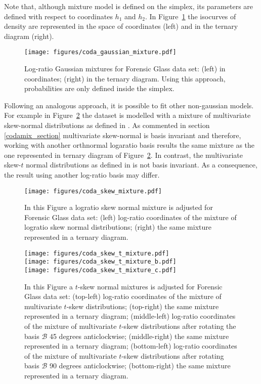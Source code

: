 \documentclass[12pt, a4paper]{article}
\begin{document}
Note that, although mixture model is defined on the simplex, its parameters are defined with respect to coordinates $h_1$ and $h_2$. In Figure~\ref{fig07fittingcodaGaussian} the isocurves of density are represented in the space
of coordinates (left) and in the ternary diagram (right).

\begin{figure}[htbp]
\centering
\texttt{[image: figures/coda\_gaussian\_mixture.pdf]}\\
\caption{Log-ratio Gaussian mixtures for Forensic Glass data set: (left) in coordinates; (right) in the ternary diagram. Using this approach, probabilities are only defined inside the simplex.}
\label{fig07fittingcodaGaussian}
\end{figure}


Following an analogous approach, it is possible to fit other non-gaussian models. For example in Figure~\ref{skewcodadist} the dataset is modelled with a mixture of multivariate skew-normal distributions as defined in \citep{prates2013mixsmsn}. As commented in section \ref{codamix_section} multivariate skew-normal is basis invariant and therefore, working with another orthnormal logaratio basis results  the same mixture as the one represented in ternary diagram of Figure~\ref{skewcodadist}. In contrast, the multivariate skew-$t$ normal distributions as defined in \citep{mclachlan2013emmixuskew} is not basis invariant. As a consequence, the result using another log-ratio basis may differ.

\begin{figure}[htbp]
\centering
\texttt{[image: figures/coda\_skew\_mixture.pdf]}\\%
\caption{In this Figure a logratio skew normal mixture is adjusted for Forensic Glass data set: (left) log-ratio coordinates of the mixture of logratio skew normal distributions; (right) the same mixture represented in a ternary diagram.}
\label{skewcodadist}
\end{figure}

\begin{figure}[htbp]
\centering
\texttt{[image: figures/coda\_skew\_t\_mixture.pdf]}\\%
\texttt{[image: figures/coda\_skew\_t\_mixture\_b.pdf]}\\%
\texttt{[image: figures/coda\_skew\_t\_mixture\_c.pdf]}
\caption{In this Figure a $t$-skew normal mixtures is adjusted for Forensic Glass data set: (top-left) log-ratio coordinates of the mixture of multivariate $t$-skew distributions; (top-right) the same mixture represented in a ternary diagram; (middle-left) log-ratio coordinates of the mixture of multivariate $t$-skew distributions after rotating the basis $\mathcal{B}$ 45 degrees anticlockwise; (middle-right) the same mixture represented in a ternary diagram; (bottom-left) log-ratio coordinates of the mixture of multivariate $t$-skew distributions after rotating basis $\mathcal{B}$ 90 degrees anticlockwise; (bottom-right) the same mixture represented in a ternary diagram.}
\label{othercodadist}
\end{figure}
\end{document}
